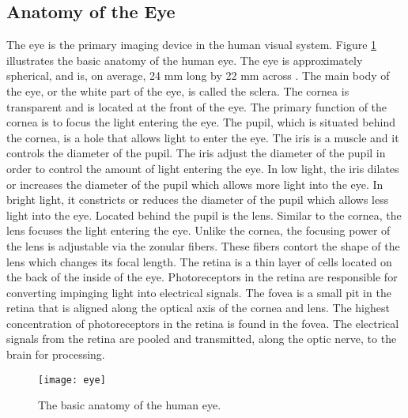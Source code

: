 \documentclass{article}
\begin{document}
\subsection{Anatomy of the Eye}
The eye is the primary imaging device in the human visual system.
Figure \ref{eye} illustrates the basic anatomy of the human eye.
The eye is approximately spherical, and is, on average, 24 mm long by 22 mm across \cite{Hecht2001}.
The main body of the eye, or the white part of the eye, is called the sclera.
The cornea is transparent and is located at the front of the eye.
The primary function of the cornea is to focus the light entering the eye.
The pupil, which is situated behind the cornea, is a hole that allows light to enter the eye.
The iris is a muscle and it controls the diameter of the pupil.
The iris adjust the diameter of the pupil in order to control the amount of light entering the eye.
In low light, the iris dilates or increases the diameter of the pupil which allows more light into the eye.
In bright light, it constricts or reduces the diameter of the pupil which allows less light into the eye.
Located behind the pupil is the lens.
Similar to the cornea, the lens focuses the light entering the eye.
Unlike the cornea, the focusing power of the lens is adjustable via the zonular fibers.
These fibers contort the shape of the lens which changes its focal length.
The retina is a thin layer of cells located on the back of the inside of the eye.
Photoreceptors in the retina are responsible for converting impinging light into electrical signals.
The fovea is a small pit in the retina that is aligned along the optical axis of the cornea and lens.
The highest concentration of photoreceptors in the retina is found in the fovea.
The electrical signals from the retina are pooled and transmitted, along the optic nerve, to the brain for processing.

\begin{figure}[!htbp]
\centering
\texttt{[image: eye]}
\caption{The basic anatomy of the human eye.}
\label{eye}
\end{figure}
\end{document}
